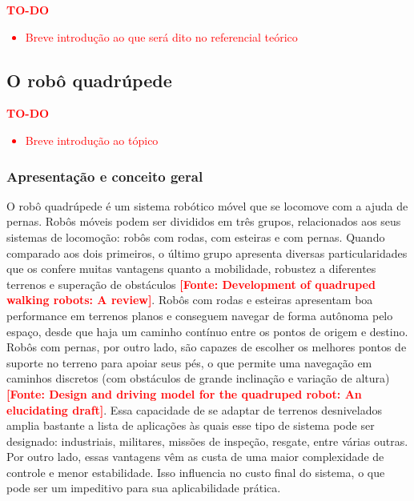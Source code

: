 \documentclass[../main.tex]{subfiles}
\begin{document}
  \textcolor{red}{\textbf{TO-DO}
  \begin{itemize}
    \item Breve introdução ao que será dito no referencial teórico
  \end{itemize}
  }

  \subsection{O robô quadrúpede}
  \textcolor{red}{\textbf{TO-DO}
  \begin{itemize}
    \item Breve introdução ao tópico
  \end{itemize}
  }

  \subsubsection{Apresentação e conceito geral}
  O robô quadrúpede é um sistema robótico móvel que se locomove com a ajuda de pernas. Robôs móveis podem ser divididos em três grupos, relacionados aos seus sistemas de locomoção: robôs com rodas, com esteiras e com pernas. Quando comparado aos dois primeiros, o último grupo apresenta diversas particularidades que os confere muitas vantagens quanto a mobilidade, robustez a diferentes terrenos e superação de obstáculos \textbf{\textcolor{red}{[Fonte: Development of quadruped walking robots: A review]}}. Robôs com rodas e esteiras apresentam boa performance em terrenos planos e conseguem navegar de forma autônoma pelo espaço, desde que haja um caminho contínuo entre os pontos de origem e destino. Robôs com pernas, por outro lado, são capazes de escolher os melhores pontos de suporte no terreno para apoiar seus pés, o que permite uma navegação em caminhos discretos (com obstáculos de grande inclinação e variação de altura) \textbf{\textcolor{red}{[Fonte: Design and driving model for the quadruped robot: An elucidating draft]}}. Essa capacidade de se adaptar de terrenos desnivelados amplia bastante a lista de aplicações às quais esse tipo de sistema pode ser designado: industriais, militares, missões de inspeção, resgate, entre várias outras. Por outro lado, essas vantagens vêm as custa de uma maior complexidade de controle e menor estabilidade. Isso influencia no custo final do sistema, o que pode ser um impeditivo para sua aplicabilidade prática. 
\end{document}
